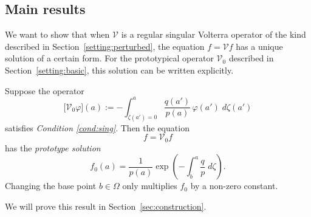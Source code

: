 \documentclass[final]{siamart220329}
\newcommand{\volterra}{\mathcal{V}}
\newcommand{\hardpart}{\mathcal{V}_0}
\newcommand{\solproto}{f_0}
\newcommand{\domain}{\Omega}
\newenvironment{revtwo}{\color{revred}}{\color{black}}
\newenvironment{revtwo}{}{}
\begin{document}
\subsection{Main results}\label{sec:results}
We want to show that when $\volterra$ is a regular singular Volterra operator of the kind described in Section~\ref{setting:perturbed}, the equation $f = \volterra f$ has a unique solution of a certain form. For the prototypical operator $\hardpart$ described in Section~\ref{setting:basic}, this solution can be written explicitly.
\begin{theorem}\label{thm:basic_volterra}
\begin{revtwo}Suppose the operator%
\[ \big[\hardpart \varphi\big](a) := - \int_{\zeta(a')=0}^{a} \frac{q(a')}{p(a)}\,\varphi(a')\;d\zeta(a') \]
\end{revtwo}
satisfies {\em Condition \eqref{cond:sing}}. Then the equation
\begin{equation}\label{eq:hardpart}
f = \hardpart f    
\end{equation}
has the {\em prototype solution}
\begin{equation}\label{eqn:test_solution}
\solproto(a) = \frac{1}{p(a)} \exp\left(-\int_{b}^{a}\frac{q}{p}\;d\zeta\right).
\end{equation}
Changing the base point $b \in \domain$ only multiplies $f_0$ by a non-zero constant.
\end{theorem}
We will prove this result in Section~\ref{sec:construction}.
\end{document}
